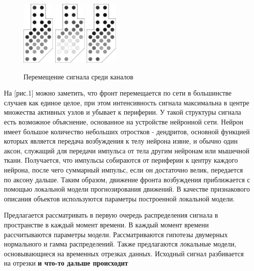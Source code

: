 \documentclass{mipt-thesis-bs}
\begin{document}
\begin{figure}
\begin{center}
	\includegraphics[width=45pt,height=\textheight,keepaspectratio]{imgs/wave0.pdf}
	\includegraphics[width=45pt,height=\textheight,keepaspectratio]{imgs/wave1.pdf}
	\includegraphics[width=45pt,height=\textheight,keepaspectratio]{imgs/wave0.pdf}
	\caption{Перемещение сигнала среди каналов}	
	\label{fig:waves}
	\end{center}
\end{figure}

На [рис.1] можно заметить, что фронт перемещается по сети в большинстве случаев как единое целое, при этом интенсивность сигнала максимальна в центре множества активных узлов и убывает к периферии. У такой структуры сигнала есть возможное объяснение, основанное на устройстве нейронной сети. Нейрон имеет большое количество небольших отростков - дендритов, основной функцией которых является передача возбуждения к телу нейрона извне, и обычно один аксон, служащий для передачи импульса от тела другим нейронам или мышечной ткани. Получается, что импульсы собираются от периферии к центру каждого нейрона, после чего суммарный импульс, если он достаточно велик, передается по аксону дальше. Таким образом, движение фронта возбуждения приближается с помощью локальной модели прогнозирования движений. В качестве признакового описания объектов используются параметры построенной локальной модели.

Предлагается рассматривать в первую очередь распределения сигнала в пространстве в каждый момент времени. В каждый момент времени рассчитываются параметры модели. Рассматриваются гипотезы двумерных нормального и гамма распределений. Также предлагаются локальные модели, основывающиеся на временных отрезках данных. Исходный сигнал разбивается на отрезки \textbf{и что-то дальше происходит}
\end{document}
